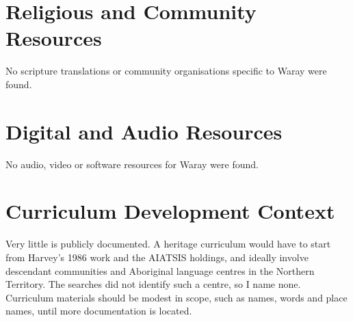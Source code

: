 \documentclass[12pt]{article}
\begin{document}
\section{Religious and Community Resources}
No scripture translations or community organisations specific to Waray were found.

\section{Digital and Audio Resources}
No audio, video or software resources for Waray were found.

\section{Curriculum Development Context}
Very little is publicly documented. A heritage curriculum would have to start from Harvey's 1986 work and the AIATSIS holdings, and ideally involve descendant communities and Aboriginal language centres in the Northern Territory. The searches did not identify such a centre, so I name none. Curriculum materials should be modest in scope, such as names, words and place names, until more documentation is located.
\end{document}
